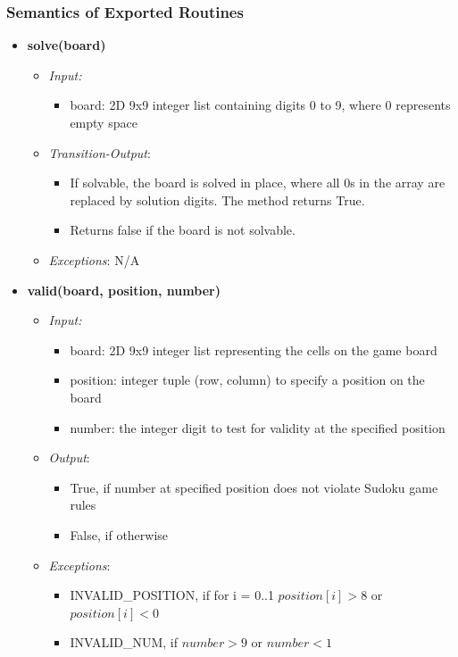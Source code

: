 \documentclass[11pt]{article}
\begin{document}
		\subsubsection{Semantics of Exported Routines}
		\begin{itemize}
		    \item \textbf{solve(board)}
		\begin{itemize}
		    \item[] \textit{Input: }
			\begin{itemize}
		        \item board: 2D 9x9 integer list containing digits 0 to 9, where 0 represents empty space
		    \end{itemize}	    
		    
		    \item[] \textit{Transition-Output}: 
		    \begin{itemize}
		        \item If solvable, the board is solved in place, where all 0s in the array are replaced by solution digits. The method returns True.
		        \item Returns false if the board is not solvable.
		    \end{itemize}
		    \item[] \textit{Exceptions}: N/A
		\end{itemize}
		
	    \item \textbf{valid(board, position, number)}
		\begin{itemize}
		    \item[] \textit{Input: } 
		    \begin{itemize}
		        \item board: 2D 9x9 integer list representing the cells on the game board
		        \item position: integer tuple (row, column) to specify a position on the board
		        \item number: the integer digit to test for validity at the specified position
		    \end{itemize}	  
		    \item[] \textit{Output}: 
		    \begin{itemize}
		        \item True, if number at specified position does not violate Sudoku game rules
		        \item False, if otherwise
		    \end{itemize}
		    \item[] \textit{Exceptions}:
		    \begin{itemize}
		        \item INVALID\_POSITION, if for i = 0..1 $position[i] > 8$ or $position[i] < 0 $
		        \item INVALID\_NUM, if $number > 9$ or $number < 1$
		    \end{itemize}
		\end{itemize}
		

\end{itemize}
\end{document}
